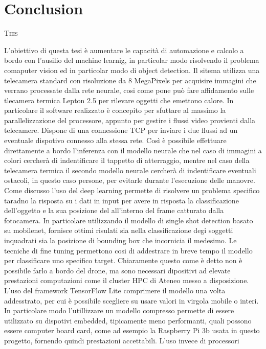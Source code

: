 \chapter{Conclusion}
\label{chap:conclusion}
%
\lettrine[lines=3]{T}{his}

L'obiettivo di questa tesi è aumentare le capacità di automazione e calcolo a
bordo con l'ausilio del machine learnig, in particolar modo risolvendo il
problema comaputer vision ed in particolar modo di object detection.
Il sitema utilizza una telecamera standard con risoluzione da 8 MegaPixels per
acquisire immagini che verrano processate dalla rete neurale, cosi come pone può
fare affidamento sulle tlecamera termica Lepton 2.5 per rilevare oggetti che
emettono calore. In particolare il software realizzato è concepito per sfuttare
al massimo la parallelizzazione del processore, appunto per gestire i flussi
video provienti dalla telecamere. Dispone di una connessione TCP per inviare i
due flussi ad un eventuale dispotivo connesso alla stessa rete.
Così è possibile effettuare direttamente a bordo l'inferenza con il modello
neurale che nel caso di immagini a colori cercherà di indentificare il tappetto
di atterraggio, mentre nel caso della telecamera termica il secondo modello
neurale cercherà di indentificare eventuali ostacoli, in questo caso persone,
per evitarle durante l'esecuzione delle manovre. 
Come discusso l'uso del deep learning permette di risolvere un problema specifico
taradno la risposta su i dati in input per avere in risposta la classificazione
dell'oggetto e la sua posizione del all'interno del frame catturato dalla
fotocamera. In particolare utilizzando il modello di single shot detection
basato su mobilenet, fornisce ottimi risulati sia nella classificazione degi
soggetti inquadrati sia la posizione di bounding box che incornicia il medesimo.
Le tecniche di fine tuning permettono cosi di addestrare in breve tempo il
modello per classificare uno specifico target. Chiaramente questo come è detto
non è possibile farlo a bordo del drone, ma sono necessari dipositivi ad elevate
prestazioni computazioni come il cluster HPC di Ateneo messo a disposizione.
L'uso del framework TensorFlow Lite comprimere il modello una volta addesstrato,
per cui è possibile scegliere su usare valori in virgola mobile o interi. In
particolare modo l'utillizzare un modello compresso permette di essere
utilizzato su dispotivi embedded, tipicamente meno performanti, quali possono
essere computer board card, come ad esempio la Raspberry Pi 3b usata in questo
progetto, fornendo quindi prestazioni accettabili. L'uso invece di processori
